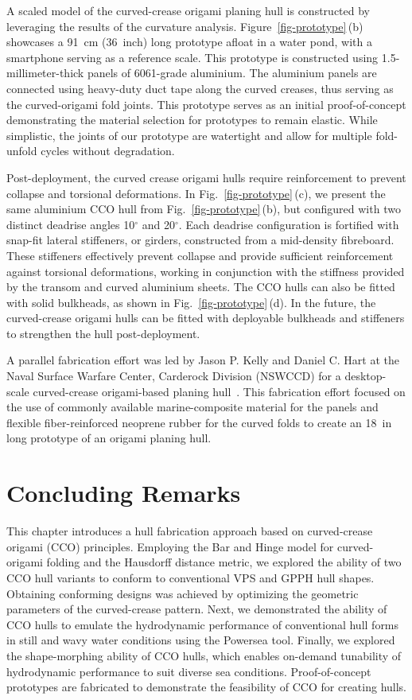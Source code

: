 A scaled model of the curved-crease origami planing hull is constructed by leveraging the results of the curvature analysis. Figure~\ref{fig-prototype}\,(b) showcases a 91~cm (36~inch) long prototype afloat in a water pond, with a smartphone serving as a reference scale. This prototype is constructed using 1.5-millimeter-thick panels of 6061-grade aluminium. The aluminium panels are connected using heavy-duty duct tape along the curved creases, thus serving as the curved-origami fold joints. This prototype serves as an initial proof-of-concept demonstrating the material selection for prototypes to remain elastic. While simplistic, the joints of our prototype are watertight and allow for multiple fold-unfold cycles without degradation.

Post-deployment, the curved crease origami hulls require reinforcement to prevent collapse and torsional deformations. In Fig.~\ref{fig-prototype}\,(c), we present the same aluminium CCO hull from Fig.~\ref{fig-prototype}\,(b), but configured with two distinct deadrise angles \textemdash{} 10\(^\circ\) and 20\(^\circ\). Each deadrise configuration is fortified with snap-fit lateral stiffeners, or girders, constructed from a mid-density fibreboard. These stiffeners effectively prevent collapse and provide sufficient reinforcement against torsional deformations, working in conjunction with the stiffness provided by the transom and curved aluminium sheets. The CCO hulls can also be fitted with solid bulkheads, as shown in Fig.~\ref{fig-prototype}\,(d). In the future, the curved-crease origami hulls can be fitted with deployable bulkheads and stiffeners to strengthen the hull post-deployment.

A parallel fabrication effort was led by Jason P. Kelly and Daniel C. Hart at the Naval Surface Warfare Center, Carderock Division (NSWCCD) for a desktop-scale curved-crease origami-based planing hull~\cite{kelly2025desktop}. This fabrication effort focused on the use of commonly available marine-composite material for the panels and flexible fiber-reinforced neoprene rubber for the curved folds to create an 18~in long prototype of an origami planing hull.

\section{Concluding Remarks}\label{05-sec-hull-conclusion}
This chapter introduces a hull fabrication approach based on curved-crease origami (CCO) principles. Employing the Bar and Hinge model for curved-origami folding and the Hausdorff distance metric, we explored the ability of two CCO hull variants to conform to conventional VPS and GPPH hull shapes. Obtaining conforming designs was achieved by optimizing the geometric parameters of the curved-crease pattern. Next, we demonstrated the ability of CCO hulls to emulate the hydrodynamic performance of conventional hull forms in still and wavy water conditions using the Powersea tool. Finally, we explored the shape-morphing ability of CCO hulls, which enables on-demand tunability of hydrodynamic performance to suit diverse sea conditions. Proof-of-concept prototypes are fabricated to demonstrate the feasibility of CCO for creating hulls.